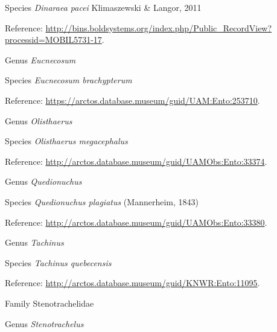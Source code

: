 \documentclass[9pt, article]{memoir}
\begin{document}
\begin{multicols}{2}
\vspace{6pt}\noindent\hspace{36pt}Species \textit{Dinaraea pacei} Klimaszewski \& Langor, 2011


Reference: 
\url{http://bins.boldsystems.org/index.php/Public_RecordView?processid=MOBIL5731-17}.

\vspace{6pt}\noindent\hspace{30pt}Genus \textit{Eucnecosum}


\vspace{6pt}\noindent\hspace{36pt}Species \textit{Eucnecosum brachypterum}


Reference: 
\url{https://arctos.database.museum/guid/UAM:Ento:253710}.

\vspace{6pt}\noindent\hspace{30pt}Genus \textit{Olisthaerus}


\vspace{6pt}\noindent\hspace{36pt}Species \textit{Olisthaerus megacephalus}


Reference: 
\url{http://arctos.database.museum/guid/UAMObs:Ento:33374}.

\vspace{6pt}\noindent\hspace{30pt}Genus \textit{Quedionuchus}


\vspace{6pt}\noindent\hspace{36pt}Species \textit{Quedionuchus plagiatus} (Mannerheim, 1843)


Reference: 
\url{http://arctos.database.museum/guid/UAMObs:Ento:33380}.

\vspace{6pt}\noindent\hspace{30pt}Genus \textit{Tachinus}


\vspace{6pt}\noindent\hspace{36pt}Species \textit{Tachinus quebecensis}


Reference: 
\url{http://arctos.database.museum/guid/KNWR:Ento:11095}.

\vspace{6pt}\noindent\hspace{24pt}Family Stenotrachelidae


\vspace{6pt}\noindent\hspace{30pt}Genus \textit{Stenotrachelus}



\end{multicols}
\end{document}
